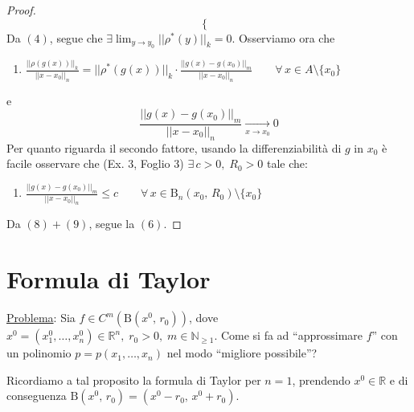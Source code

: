 \begin{proof}
$$\begin{cases}
\end{cases}
$$
Da $(4)$, segue che $\displaystyle \exists \lim_{y \rightarrow y_0} ||\rho^*(y)||_k = 0$. Osserviamo ora che
\begin{enumerate}[labelindent=\parindent,leftmargin=*,label=\textnormal{(\arabic*)},start=8]
\item $\displaystyle \frac{||\rho(g(x))||_k}{||x-x_0||_n} =
||\rho^*(g(x))||_k \cdot \frac{||g(x)-g(x_0)||_m}{||x-x_0||_n} \qquad \forall \, x \in A \setminus \lbrace x_0 \rbrace
$
\end{enumerate}
e $$ \frac{||g(x)-g(x_0)||_m}{||x-x_0||_n} \underset{x \rightarrow x_0}{\longrightarrow} 0$$
Per quanto riguarda il secondo fattore, usando la differenziabilità di $g$ in $x_0$ è facile osservare che (Ex. 3, Foglio 3) $\exists \, c > 0, \; R_0 > 0$ tale che:
\begin{enumerate}[labelindent=\parindent,leftmargin=*,label=\textnormal{(\arabic*)},start=8]
\item $\displaystyle \frac{||g(x)-g(x_0)||_m}{||x-x_0||_n} \leq c \qquad \forall \, x \in \mathrm{B}_n (x_0,\,R_0) \setminus \lbrace x_0 \rbrace$
\end{enumerate}
Da $(8)+(9)$, segue la $(6)$.
\end{proof}



\section{Formula di Taylor}
\underline{Problema}: Sia $f \in C^m(\mathrm{B}(x^0,\,r_0))$, dove $x^0=(x^0_1,\ldots,x^0_n) \in \mathbb{R}^n, \; r_0 > 0, \; m \in \mathbb{N}_{\geq 1}$.
Come si fa ad ``approssimare $f$'' con un polinomio $p=p(x_1,\ldots,x_n)$ nel modo ``migliore possibile''?

Ricordiamo a tal proposito la formula di Taylor per $n=1$, prendendo $x^0 \in \mathbb{R}$ e di conseguenza $\mathrm{B}(x^0,\,r_0)=(x^0-r_0,\,x^0+r_0)$.


